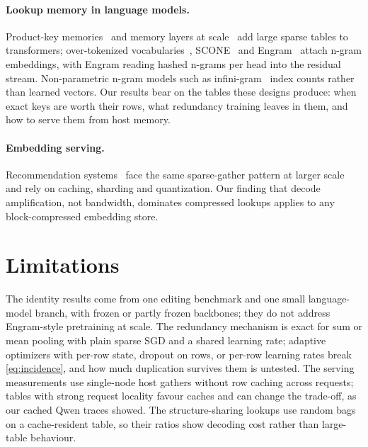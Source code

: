 \documentclass[10pt]{article}
\begin{document}
\paragraph{Lookup memory in language models.} Product-key memories~\citep{lample2019large} and memory layers at scale~\citep{berges2024memory} add large sparse tables to transformers; over-tokenized vocabularies~\citep{huang2025overtokenized}, SCONE~\citep{yu2025scone} and Engram~\citep{deepseek2026engram} attach n-gram embeddings, with Engram reading hashed n-grams per head into the residual stream. Non-parametric n-gram models such as infini-gram~\citep{liu2024infinigram} index counts rather than learned vectors. Our results bear on the tables these designs produce: when exact keys are worth their rows, what redundancy training leaves in them, and how to serve them from host memory.

\paragraph{Embedding serving.} Recommendation systems~\citep{naumov2019dlrm} face the same sparse-gather pattern at larger scale and rely on caching, sharding and quantization. Our finding that decode amplification, not bandwidth, dominates compressed lookups applies to any block-compressed embedding store.

\section{Limitations}

The identity results come from one editing benchmark and one small language-model branch, with frozen or partly frozen backbones; they do not address Engram-style pretraining at scale. The redundancy mechanism is exact for sum or mean pooling with plain sparse SGD and a shared learning rate; adaptive optimizers with per-row state, dropout on rows, or per-row learning rates break \cref{eq:incidence}, and how much duplication survives them is untested. The serving measurements use single-node host gathers without row caching across requests; tables with strong request locality favour caches and can change the trade-off, as our cached Qwen traces showed. The structure-sharing lookups use random bags on a cache-resident table, so their ratios show decoding cost rather than large-table behaviour.

\end{document}
